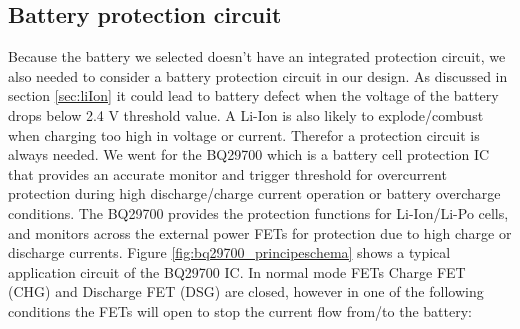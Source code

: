 \documentclass[11pt,a4paper]{article}
\begin{document}
\subsection{Battery protection circuit}\label{sec:bat_prot_circuit}
Because the battery we selected doesn't have an integrated protection circuit, we also needed to consider a battery protection circuit in our design. As discussed in section \ref{sec:liIon} it could lead to battery defect when the voltage of the battery drops below 2.4 V threshold value. A Li-Ion is also likely to explode/combust when charging too high in voltage or current. Therefor a protection circuit is always needed. We went for the BQ29700 which is a battery cell protection IC that provides an accurate monitor and trigger threshold for overcurrent protection during high discharge/charge current operation or battery overcharge conditions. The BQ29700 provides the protection functions for Li-Ion/Li-Po cells, and monitors across the external power FETs for protection due to high charge or discharge currents. Figure \ref{fig:bq29700_principeschema} shows a typical application circuit of the BQ29700 IC. In normal mode FETs Charge FET (CHG) and Discharge FET (DSG) are closed, however in one of the following conditions the FETs will open to stop the current flow from/to the battery:
\end{document}

